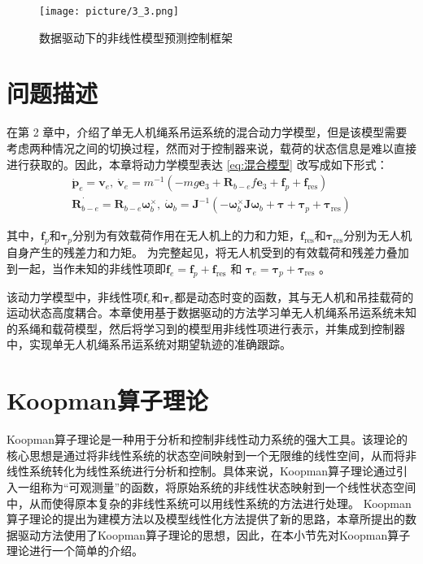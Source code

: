 \documentclass[lang=chs, degree=master, blindreview=true, winfonts=true]{yanputhesis}
\begin{document}
\begin{figure}[hbt!]
	\centering
	\texttt{[image: picture/3\_3.png]} 
	\caption{数据驱动下的非线性模型预测控制框架} 
	\label{illustration_framework}
\end{figure}

\section{问题描述}
在第 2 章中，介绍了单无人机绳系吊运系统的混合动力学模型，但是该模型需要考虑两种情况之间的切换过程，然而对于控制器来说，载荷的状态信息是难以直接进行获取的。因此，本章将动力学模型表达 \autoref{eq:混合模型} 改写成如下形式：
\begin{equation}
	\begin{aligned}
		\dot{\boldsymbol{p}}_e = \boldsymbol{v}_e, \
		\dot{\boldsymbol{v}}_e = m^{-1}\left(-mg\bm{e}_3+\boldsymbol{R}_{b-e}f\bm{e}_3+\bm{f}_p+\bm{f}_{\text{res}}\right) \\
		\dot{\bm{R}_{b-e}} = \bm{R}_{b-e} \bm{\omega}_b^{\times}, \
		\dot{\boldsymbol{\omega}}_b = \boldsymbol{J}^{-1}\left(-\bm{\omega}_b^{\times}\bm{J} \bm{\omega}_b+\boldsymbol{\tau}+ \bm{\tau}_p+ \bm{\tau}_{\text{res}}\right)
	\end{aligned}\label{3-1}
\end{equation}



其中，$\bm{f}_p$和$\bm{\tau}_p$分别为有效载荷作用在无人机上的力和力矩，$\bm{f}_\text{res}$和$\bm{\tau}_\text{res}$分别为无人机自身产生的残差力和力矩。
为完整起见，将无人机受到的有效载荷和残差力叠加到一起，当作未知的非线性项即$\bm f_e = \bm f_p+ \bm f_{\text{res}}$ 和 $\bm \tau_e = \bm \tau_p+\bm \tau_{\text{res}}$ 。
	
该动力学模型中，非线性项$\bm f_e$和$\bm \tau_e$都是动态时变的函数，其与无人机和吊挂载荷的运动状态高度耦合。本章使用基于数据驱动的方法学习单无人机绳系吊运系统未知的系绳和载荷模型，然后将学习到的模型用非线性项进行表示，并集成到控制器中，实现单无人机绳系吊运系统对期望轨迹的准确跟踪。 




\section{Koopman算子理论}

Koopman算子理论是一种用于分析和控制非线性动力系统的强大工具\cite{1931Hamiltonian}。该理论的核心思想是通过将非线性系统的状态空间映射到一个无限维的线性空间，从而将非线性系统转化为线性系统进行分析和控制。具体来说，Koopman算子理论通过引入一组称为“可观测量”的函数，将原始系统的非线性状态映射到一个线性状态空间中，从而使得原本复杂的非线性系统可以用线性系统的方法进行处理。
Koopman算子理论的提出为建模方法以及模型线性化方法提供了新的思路，本章所提出的数据驱动方法使用了Koopman算子理论的思想，因此，在本小节先对Koopman算子理论进行一个简单的介绍。
\end{document}
